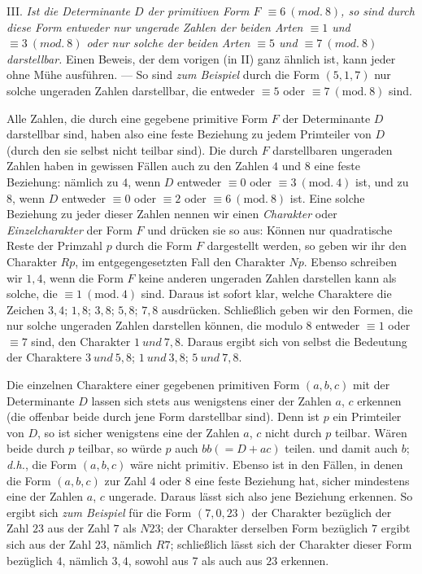 III. \textit{Ist die Determinante $D$ der primitiven Form $F$ $\equiv6\ (\mathit{mod.}\ 8)$, so sind durch diese Form entweder nur ungerade Zahlen der beiden Arten $\equiv1$ und $\equiv3\ (\mathit{mod.}\ 8)$ oder nur solche der beiden Arten $\equiv5$ und $\equiv7\ (\mathit{mod.}\ 8)$ darstellbar.} Einen Beweis, der dem vorigen (in II) ganz ähnlich ist, kann jeder ohne Mühe ausführen. --- So sind \textit{zum Beispiel} durch die Form $(5,1,7)$ nur solche ungeraden Zahlen darstellbar, die entweder $\equiv5$ oder $\equiv7\ (\mathrm{mod.}\ 8)$ sind.

Alle Zahlen, die durch eine gegebene primitive Form $F$ der Determinante $D$ darstellbar sind, haben also eine feste Beziehung zu jedem Primteiler von $D$ (durch den sie selbst nicht teilbar sind). Die durch $F$ darstellbaren ungeraden Zahlen haben in gewissen Fällen auch zu den Zahlen $4$ und $8$ eine feste Beziehung: nämlich zu $4$, wenn $D$ entweder $\equiv0$ oder $\equiv3\ (\mathrm{mod.}\ 4)$ ist, und zu $8$, wenn $D$ entweder $\equiv0$ oder $\equiv2$ oder $\equiv6\ (\mathrm{mod.}\ 8)$ ist. Eine solche Beziehung zu jeder dieser Zahlen nennen wir einen \textit{Charakter} oder \textit{Einzelcharakter} der Form $F$ und drücken sie so aus: Können nur quadratische Reste der Primzahl $p$ durch die Form $F$ dargestellt werden, so geben wir ihr den Charakter $Rp$, im entgegengesetzten Fall den Charakter $Np$. Ebenso schreiben wir $1,4$, wenn die Form $F$ keine anderen ungeraden Zahlen darstellen kann als solche, die $\equiv1\ (\mathrm{mod.}\ 4)$ sind. Daraus ist sofort klar, welche Charaktere die Zeichen $3,4$; $1,8$; $3,8$; $5,8$; $7,8$ ausdrücken. Schließlich geben wir den Formen, die nur solche ungeraden Zahlen darstellen können, die modulo
$8$ entweder $\equiv1$ oder $\equiv7$ sind, den Charakter $1\ \mathit{und}\ 7,8$. Daraus ergibt sich von selbst die Bedeutung der Charaktere $3\ \mathit{und}\ 5,8$; $1\ \mathit{und}\ 3,8$; $5\ \mathit{und}\ 7,8$.

Die einzelnen Charaktere einer gegebenen primitiven Form $(a,b,c)$ mit der Determinante $D$ lassen sich stets aus wenigstens einer der Zahlen $a$, $c$ erkennen (die offenbar beide durch jene Form darstellbar sind). Denn ist $p$ ein Primteiler von $D$, so ist sicher wenigstens eine der Zahlen $a$, $c$ nicht durch $p$ teilbar. Wären beide durch $p$ teilbar, so würde $p$ auch $bb(=D+ac)$ teilen. und damit auch $b$; \textit{d.h.}, die Form $(a,b,c)$ wäre nicht primitiv. Ebenso ist in den Fällen, in denen die Form $(a,b,c)$ zur Zahl $4$ oder $8$ eine feste Beziehung hat, sicher mindestens eine der Zahlen $a$, $c$ ungerade. Daraus lässt sich also jene Beziehung erkennen. So ergibt sich \textit{zum Beispiel} für die Form $(7,0,23)$ der Charakter bezüglich der Zahl $23$ aus der Zahl $7$ als $N23$; der Charakter derselben Form bezüglich $7$ ergibt sich aus der Zahl $23$, nämlich $R7$; schließlich lässt sich der Charakter dieser Form bezüglich $4$, nämlich $3,4$, sowohl aus $7$ als auch aus $23$ erkennen.

